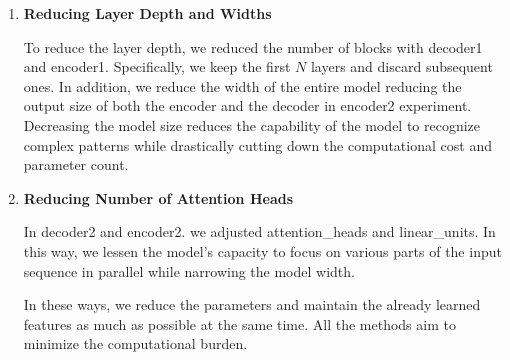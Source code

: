 \documentclass[11pt]{article}
\begin{document}
\begin{table}[h]
    \centering
    \caption{Parameter settings for different models compared to original ESPNet parameters. -- indicates that the parameter retains its original value.}
    \label{tab:model_parameters}
\end{table}

\begin{enumerate}
    \item \textbf{Reducing Layer Depth and Widths}

To reduce the layer depth, we reduced the number of blocks with decoder1 and encoder1.
Specifically, we keep the first $N$ layers and discard subsequent ones.
In addition, we reduce the width of the entire model reducing the output size of both the encoder and the decoder in encoder2 experiment.
Decreasing the model size reduces the capability of the model to recognize complex patterns while drastically cutting down the computational cost and parameter count.

\item \textbf{Reducing Number of Attention Heads}

In decoder2 and encoder2. we adjusted attention\_heads and linear\_units. In this way, we lessen the model's capacity to focus on various parts of the input sequence in parallel while narrowing the model width.

In these ways, we reduce the parameters and maintain the already learned features as much as possible at the same time. All the methods aim to minimize the computational burden.
\end{enumerate}
\end{document}
